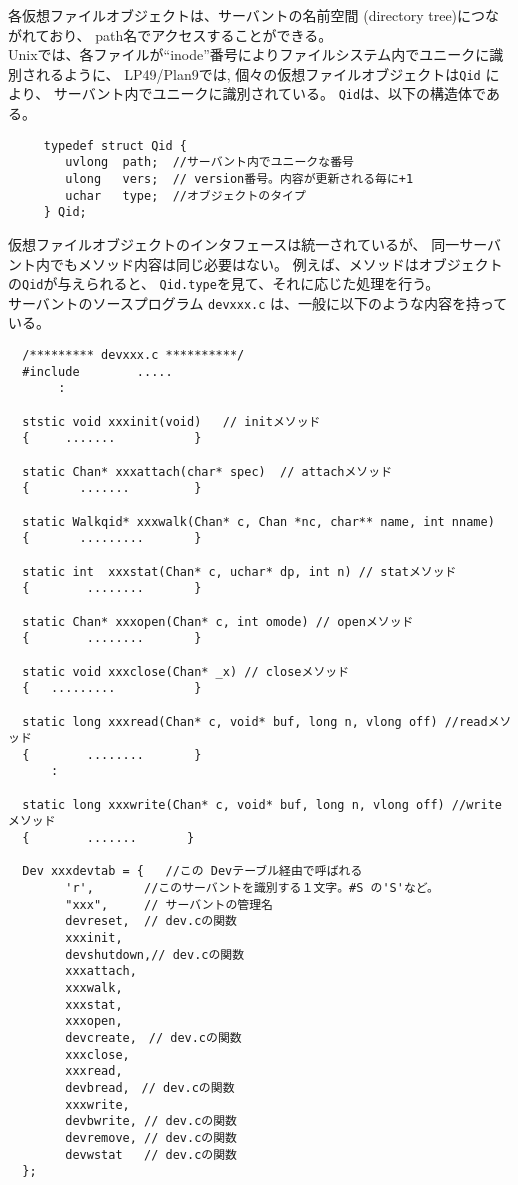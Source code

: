 {各仮想ファイルオブジェクトは、サーバントの名前空間 (directory tree)につながれており、
path名でアクセスすることができる。
\\

Unixでは、各ファイルが``inode''番号によりファイルシステム内でユニークに識別されるように、
LP49/Plan9では, 個々の仮想ファイルオブジェクトは{\tt Qid} により、
サーバント内でユニークに識別されている。
{\tt Qid}は、以下の構造体である。

\begin{verbatim}
     typedef struct Qid {
        uvlong  path;  //サーバント内でユニークな番号
        ulong   vers;  // version番号。内容が更新される毎に+1
        uchar   type;  //オブジェクトのタイプ
     } Qid;
\end{verbatim}

仮想ファイルオブジェクトのインタフェースは統一されているが、
同一サーバント内でもメソッド内容は同じ必要はない。
例えば、メソッドはオブジェクトの{\tt Qid}が与えられると、
{\tt Qid.type}を見て、それに応じた処理を行う。
\\


サーバントのソースプログラム {\tt devxxx.c} は、一般に以下のような内容を持っている。

{\small
\begin{verbatim}    
  /********* devxxx.c **********/
  #include        .....
       :

  ststic void xxxinit(void)   // initメソッド
  {     .......           }

  static Chan* xxxattach(char* spec)  // attachメソッド
  {       .......         }  

  static Walkqid* xxxwalk(Chan* c, Chan *nc, char** name, int nname)
  {       .........       }

  static int  xxxstat(Chan* c, uchar* dp, int n) // statメソッド
  {        ........       }

  static Chan* xxxopen(Chan* c, int omode) // openメソッド
  {        ........       }

  static void xxxclose(Chan* _x) // closeメソッド
  {   .........           }

  static long xxxread(Chan* c, void* buf, long n, vlong off) //readメソッド
  {        ........       }
      :

  static long xxxwrite(Chan* c, void* buf, long n, vlong off) //writeメソッド
  {        .......       }

  Dev xxxdevtab = {   //この Devテーブル経由で呼ばれる
        'r',       //このサーバントを識別する１文字。#S の'S'など。
        "xxx",     // サーバントの管理名
        devreset,  // dev.cの関数
        xxxinit,
        devshutdown,// dev.cの関数
        xxxattach,
        xxxwalk,
        xxxstat,
        xxxopen,
        devcreate,　// dev.cの関数
        xxxclose,
        xxxread,
        devbread,　// dev.cの関数
        xxxwrite,
        devbwrite, // dev.cの関数
        devremove, // dev.cの関数
        devwstat   // dev.cの関数
  };


\end{verbatim}}}
